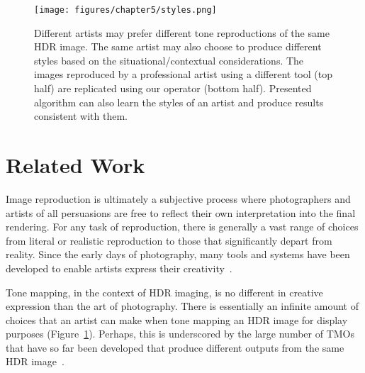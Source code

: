 \begin{figure}
\begin{center}
\texttt{[image: figures/chapter5/styles.png]}
\caption{Different artists may prefer different tone reproductions of the same HDR image. The same artist may also choose to produce different styles based on the situational/contextual considerations. The images reproduced by a professional artist using a different tool (top half) are replicated using our operator (bottom half). Presented algorithm can also learn the styles of an artist and produce results consistent with them.}
\label{fig:styles}
\end{center}
\end{figure}

\section{Related Work}
Image reproduction is ultimately a subjective process where photographers and artists of all persuasions are free to reflect their own interpretation into the final rendering. For any task of reproduction, there is generally a vast range of choices from literal or realistic reproduction to those that significantly depart from reality. Since the early days of photography, many tools and systems have been developed to enable artists express their creativity~\cite{Adams80,Adams81,Adams83,White84}.

Tone mapping, in the context of HDR imaging, is no different in creative expression than the art of photography. There is essentially an infinite amount of choices that an artist can make when tone mapping an HDR image for display purposes (Figure~\ref{fig:styles}). Perhaps, this is underscored by the large number of TMOs that have so far been developed that produce different outputs from the same HDR image~\cite{Rein2010}.

